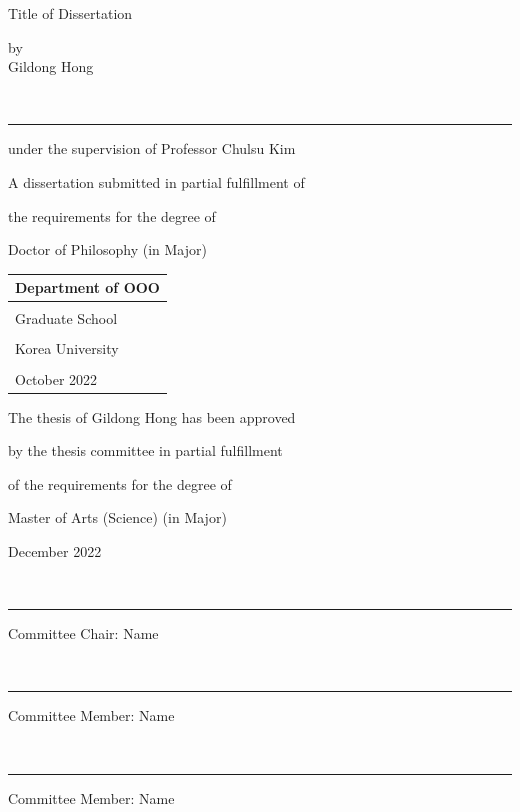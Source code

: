 \documentclass[11pt]{report}
\theoremstyle{plain}
\theoremstyle{definition}
\theoremstyle{corollary}
\theoremstyle{definition}
\theoremstyle{plain}
\theoremstyle{definition}
\theoremstyle{plain}
\begin{document}
\newpage
\begin{center}
\huge Title of Dissertation
\par\vspace{50pt}
\Large by\\
Gildong Hong
\par\vspace{20pt}
{\small\color{gray}{student signiture}}\\[-15pt]
\rule{.6\textwidth}{0.4pt}
\par\vspace{20pt}
under the supervision of Professor Chulsu Kim
\par\vspace{20pt}
A dissertation submitted in partial fulfillment of \par
the requirements for the degree of \par
Doctor of Philosophy (in Major)
\par\vspace{10pt}
\end{center}
\noindent
\begin{tabularx}{\textwidth}{| >{\centering\arraybackslash}X |}
\arrayrulecolor{gray}
\hline
\Large Department of OOO \\\hline
\rule{0pt}{30pt}\\\hline
\LARGE Graduate School \\\hline
\\[-8pt]\hline
\LARGE Korea University \\\hline
\rule{0pt}{20pt}\\\hline
\large October 2022 \\\hline
\end{tabularx}

\newpage
\begin{center}
\Large
The thesis of Gildong Hong has been approved \par
by the thesis committee in partial fulfillment\par
of the requirements for the degree of \par
Master of Arts (Science) (in Major) 
\par\vspace{50pt}
\large December 2022
\par\vspace{50pt}
{\small\color{gray}{student signiture}}\\[-10pt]\rule{.6\textwidth}{0.4pt}\par
Committee Chair: Name
\par\vspace{20pt}
{\small\color{gray}{student signiture}}\\[-10pt]\rule{.6\textwidth}{0.4pt}\par
Committee Member: Name
\par\vspace{20pt}
{\small\color{gray}{student signiture}}\\[-10pt]\rule{.6\textwidth}{0.4pt}\par
Committee Member: Name 
\end{center}
\end{document}
